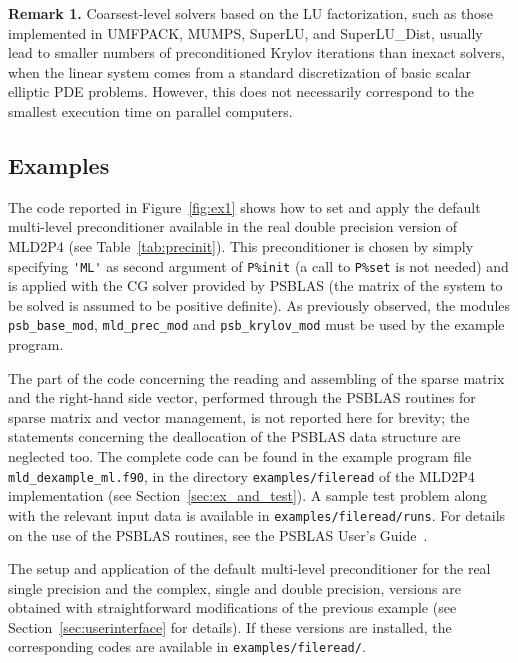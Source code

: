 \textbf{Remark 1.} Coarsest-level solvers based on the LU factorization,
such as those implemented in UMFPACK, MUMPS, SuperLU, and SuperLU\_Dist,
usually lead to smaller numbers of preconditioned Krylov
iterations than inexact solvers, when the linear system comes from
a standard discretization of basic scalar elliptic PDE problems. However,
this does not necessarily correspond to the smallest execution time
on parallel computers. 



\subsection{Examples\label{sec:examples}}

The code reported in Figure~\ref{fig:ex1} shows how to set and apply the default
multi-level preconditioner available in the real double precision version
of MLD2P4 (see Table~\ref{tab:precinit}). This preconditioner is chosen
by simply specifying \verb|'ML'| as second argument of \verb|P%init|
(a call to \verb|P%set| is not needed) and is applied with the CG
solver provided by PSBLAS (the matrix of the system to be solved is
assumed to be positive definite). As previously observed, the modules
\verb|psb_base_mod|, \verb|mld_prec_mod| and \verb|psb_krylov_mod|
must be used by the example program.
 
The part of the code concerning the
reading and assembling of the sparse matrix and the right-hand side vector, performed
through the PSBLAS routines for sparse matrix and vector management, is not reported
here for brevity; the statements concerning the deallocation of the PSBLAS
data structure are neglected too.
The complete code can be found in the example program file \verb|mld_dexample_ml.f90|,
in the directory \verb|examples/fileread| of the MLD2P4 implementation (see
Section~\ref{sec:ex_and_test}). A sample test problem along with the relevant
input data is available in \verb|examples/fileread/runs|.
For details on the use of the PSBLAS routines, see the PSBLAS User's
Guide~\cite{PSBLASGUIDE}.

The setup and application of the default multi-level preconditioner
for the real single precision and the complex, single and double
precision, versions are obtained with straightforward modifications of the previous
example (see Section~\ref{sec:userinterface} for details). If these versions are installed,
the corresponding codes are available in \verb|examples/fileread/|.

